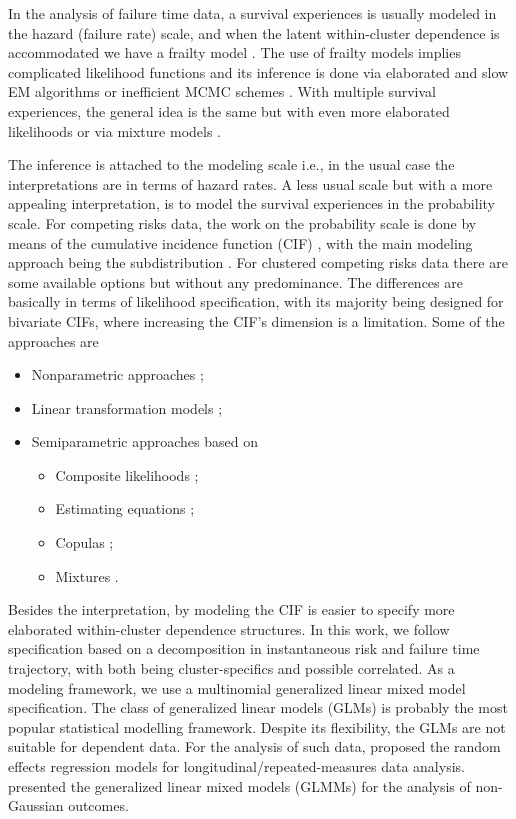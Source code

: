 \documentclass[a4paper,12pt]{article}
\begin{document}
In the analysis of failure time data, a survival experiences is usually
modeled in the hazard (failure rate) scale, and when the latent
within-cluster dependence is accommodated we have a frailty model
\citep{frailty78,frailty79,liang95,petersen98}. The use of frailty
models implies complicated likelihood functions and its inference is
done via elaborated and slow EM algorithms \citep{nielsen92,klein92} or
inefficient MCMC schemes \citep{hougaard00}. With multiple survival
experiences, the general idea is the same but with even more elaborated
likelihoods \citep{prentice78,therneau00} or via mixture models
\citep{larson85,kuk92}.

The inference is attached to the modeling scale i.e., in the usual case
the interpretations are in terms of hazard rates. A less usual scale but
with a more appealing interpretation, is to model the survival
experiences in the probability scale. For competing risks data, the work
on the probability scale is done by means of the cumulative incidence
function (CIF) \citep{andersen12}, with the main modeling approach being
the subdistribution \citep{fine&gray}. For clustered competing risks
data there are some available options but without any predominance. The
differences are basically in terms of likelihood specification, with its
majority being designed for bivariate CIFs, where increasing the CIF's
dimension is a limitation. Some of the approaches are

\begin{itemize}
 \item Nonparametric approaches \citep{cheng07,cheng09};
 \item Linear transformation models \citep{fine99,gerds12};
 \item Semiparametric approaches based on
  \begin{itemize}
   \item Composite likelihoods \citep{shih,SCHEIKE};
   \item Estimating equations \citep{crossoddsratioSCHEIKE,cheng&fine};
   \item Copulas \citep{semiparametricSCHEIKE};
   \item Mixtures \citep{naskar05,shi13}.
  \end{itemize}
\end{itemize}

Besides the interpretation, by modeling the CIF is easier to specify
more elaborated within-cluster dependence structures. In this work, we
follow \cite{SCHEIKE} specification based on a decomposition in
instantaneous risk and failure time trajectory, with both being
cluster-specifics and possible correlated. As a modeling framework, we
use a multinomial generalized linear mixed model specification. The
class of generalized linear models (GLMs) \citep{GLM72} is probably the
most popular statistical modelling framework. Despite its flexibility,
the GLMs are not suitable for dependent data. For the analysis of such
data, \cite{laird82} proposed the random effects regression models for
longitudinal/repeated-measures data analysis. \cite{breslow93} presented
the generalized linear mixed models (GLMMs) for the analysis of
non-Gaussian outcomes.
\end{document}
